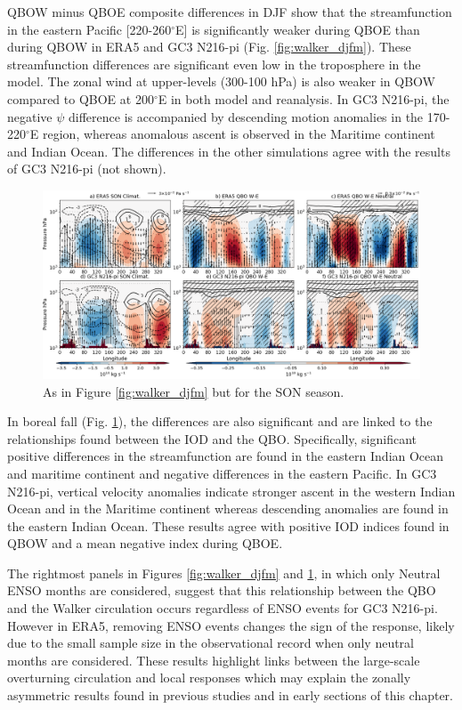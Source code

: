 QBOW minus QBOE composite differences in DJF show that the streamfunction in the eastern Pacific [220-260$^\circ$E] is significantly weaker during QBOE than during QBOW in ERA5 and GC3 N216-pi (Fig. \ref{fig:walker_djfm}). These streamfunction differences are significant even low in the troposphere in the model. The zonal wind at upper-levels (300-100 hPa) is also weaker in QBOW compared to QBOE at 200$^\circ$E in both model and reanalysis. In GC3 N216-pi, the negative $\psi$ difference is accompanied by descending motion anomalies in the 170-220$^\circ$E region, whereas anomalous ascent is observed in the Maritime continent and Indian Ocean. The differences in the other simulations agree with the results of GC3 N216-pi (not shown).

\begin{figure}[t!]
\centering
 \noindent
 \includegraphics[width=\linewidth]{figures/cmip_era5_streamson.png}
\caption[Walker circulation anomalies in SON]{As in Figure \ref{fig:walker_djfm} but for the SON season. }
\label{fig:walker_son}
\end{figure}

In boreal fall (Fig. \ref{fig:walker_son}), the differences are also significant and are linked to the relationships found between the IOD and the QBO. 
Specifically, significant positive differences in the streamfunction are found 
in the eastern Indian Ocean and maritime continent and negative differences in the eastern Pacific. 
In GC3 N216-pi, vertical velocity anomalies indicate stronger ascent in the western Indian Ocean and in the Maritime continent whereas descending anomalies are found in the eastern Indian Ocean. These results agree with positive IOD indices found in QBOW and a mean negative index during QBOE.



The rightmost panels in  Figures \ref{fig:walker_djfm} and \ref{fig:walker_son}, in which only Neutral ENSO months are considered, suggest that this relationship between the QBO and the Walker circulation occurs regardless of ENSO events for GC3 N216-pi. However in ERA5, removing ENSO events changes the sign of the response, likely due to the small sample size in the observational record when only neutral months are considered. 
These results highlight links between the large-scale overturning circulation and local responses which may explain the zonally asymmetric results found in previous studies and in early sections of this chapter.



